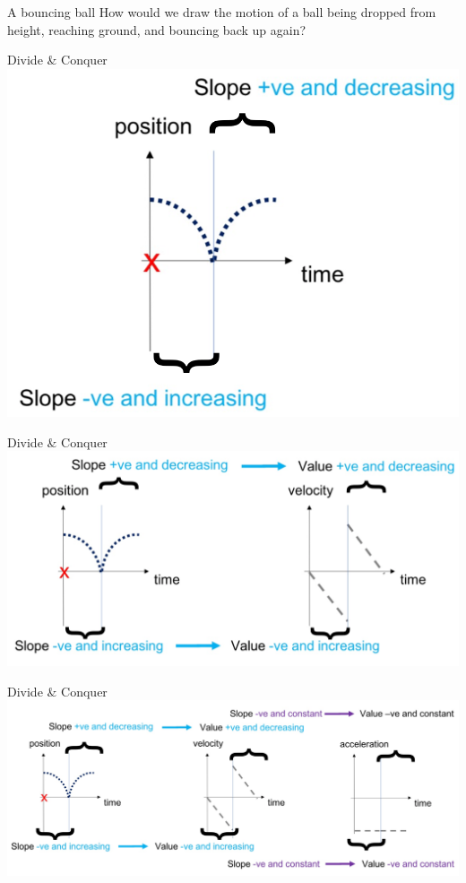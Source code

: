 \begin{frame}{A bouncing ball}
\small
How would we draw the motion of a ball being dropped from height, reaching ground, and bouncing back up again?\\
\vspace{5cm}

\end{frame}


\begin{frame}{Divide \& Conquer}
\notsotiny
\includegraphics[scale=0.4]{ball1}

\end{frame}

\begin{frame}{Divide \& Conquer}
\notsotiny
\includegraphics[scale=0.4]{ball2}

\end{frame}

\begin{frame}{Divide \& Conquer}
\notsotiny
\includegraphics[scale=0.4]{ball3}

\end{frame}

